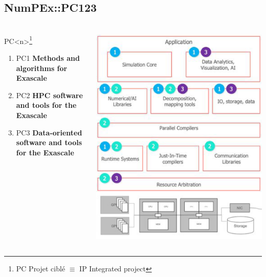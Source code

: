 \subsection{NumPEx::PC123}

\begin{frame}
  \frametitle{\insertsectionhead}
  \framesubtitle{\insertsubsectionhead}
  \begin{columns}
    \begin{column}{0.5\textwidth}
      \begin{alertblock}{PC<n>\footnote{PC Projet ciblé $\equiv$ IP Integrated project}}

      \begin{enumerate}
        \item \alert{PC1} \textbf{Methods and algorithms for
        Exascale}
        \item \alert{PC2} \textbf{HPC software and tools for the
        Exascale}
        \item \alert{PC3} \textbf{Data-oriented software and tools
        for the Exascale}
      \end{enumerate}
              
    \end{alertblock}
    \end{column}
    \begin{column}{.5\textwidth}
      \includegraphics[height=.76\paperheight]{../figures/numpex-ip123.png}
    \end{column}
  \end{columns}
  
\end{frame}
